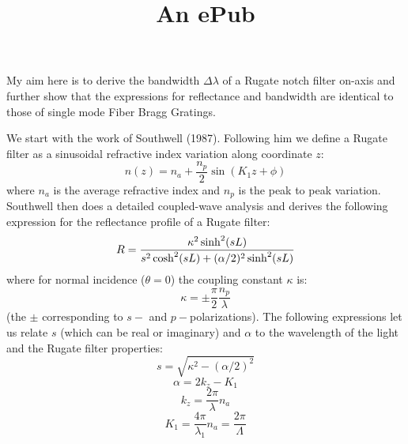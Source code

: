 \documentclass[text,itex,epub]{internet}
\title{An ePub}
\begin{document}
\tableofcontents

My aim here is to derive the bandwidth $\Delta\lambda$ of a Rugate notch filter on-axis and further show that the expressions for reflectance and bandwidth are identical to those of single mode Fiber Bragg Gratings. 

We start with the work of Southwell (1987).  Following him we define a Rugate filter as a  sinusoidal refractive index variation along coordinate $z$:
\[ n(z) = n_a + \frac{n_p}{2} \sin(K_1 z + \phi)  \] 
where $n_a$ is the average refractive index and $n_p$ is the peak to peak variation.
Southwell then does a  detailed coupled-wave analysis and derives 
the following expression for the reflectance profile of a Rugate filter:
\[
R= {  \kappa^2 \sinh^2(sL) \over
s^2 \cosh^2(sL) + (\alpha/2)^2 \sinh^2(sL)
}
\]
where for normal incidence ($\theta=0$) the coupling constant $\kappa$ is:
\[\kappa= \pm \frac{\pi}{2} \frac{n_p}{\lambda}  \]
(the $\pm$ corresponding to $s-$ and $p-$polarizations). The following expressions let us relate $s$ (which can be real or imaginary) and $\alpha$ 
to the wavelength of the light and the Rugate filter properties:
\[ s=\sqrt{\kappa^2 - (\alpha/2)^2} \]
\[ \alpha = 2 k_z - K_1 \]
\[k_z = \frac{2 \pi}{\lambda} n_a \]
\[ K_1  =  \frac{4 \pi}{\lambda_1} n_a = \frac{2 \pi}{\Lambda}\]
\end{document}
